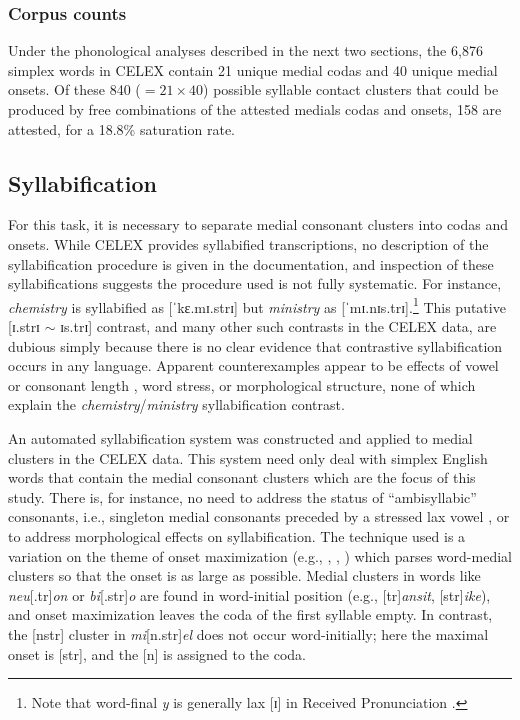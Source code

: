\citet{Halle1962}


\subsubsection{Corpus counts}

Under the phonological analyses described in the next two sections, the 6,876 simplex words in CELEX contain 21 unique medial codas and 40 unique medial onsets. Of these 840 ($= 21 \times 40$) possible syllable contact clusters that could be produced by free combinations of the attested medials codas and onsets, 158 are attested, for a 18.8\% saturation rate.

\subsection{Syllabification}

For this task, it is necessary to separate medial consonant clusters into codas and onsets. While CELEX provides syllabified transcriptions, no description of the syllabification procedure is given in the documentation, and inspection of these syllabifications suggests the procedure used is not fully systematic. For instance, \emph{chemistry} is syllabified as [ˈkɛ.mɪ.strɪ] but \emph{ministry} as [ˈmɪ.nɪs.trɪ].\footnote{Note that word-final \emph{y} is generally lax [ɪ] in Received Pronunciation \citep[][294]{AOE2}.} This putative [ɪ.strɪ $\sim$ ɪs.trɪ] contrast, and many other such contrasts in the CELEX data, are dubious simply because there is no clear evidence that contrastive syllabification occurs in any language. Apparent counterexamples appear to be effects of vowel or consonant length \citep[e.g.,][]{Elfner2006}, word stress, or morphological structure, none of which explain the \emph{chemistry}/\emph{ministry} syllabification contrast.

An automated syllabification system was constructed and applied to medial clusters in the CELEX data. This system need only deal with simplex English words that contain the medial consonant clusters which are the focus of this study.  There is, for instance, no need to address the status of ``ambisyllabic'' consonants, i.e., singleton medial consonants preceded by a stressed lax vowel \citep[][219f.]{Rubach1996}, or to address morphological effects on syllabification. The technique used is a variation on the theme of onset maximization (e.g., \citealt{Kurylowicz1948}, \citealt[42f.]{Kahn1976}, \citealt[][?]{Selkirk1983}) which parses word-medial clusters so that the onset is as large as possible. Medial clusters in words like \emph{neu}[.tr]\emph{on} or \emph{bi}[.str]\emph{o} are found in word-initial position (e.g., [tr]\emph{ansit}, [str]\emph{ike}), and onset maximization leaves the coda of the first syllable empty. In contrast, the [nstr] cluster in \emph{mi}[n.str]\emph{el} does not occur word-initially; here the maximal onset is [str], and the [n] is assigned to the coda.

